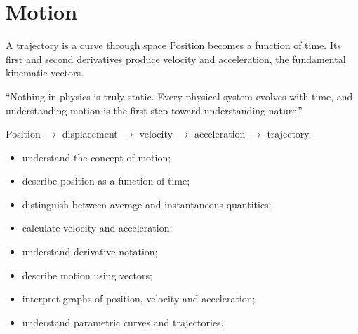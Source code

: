 \chapter{Motion}
\chapteropeningart
{A trajectory is a curve through space}
{Position becomes a function of time. Its first and second derivatives produce
velocity and acceleration, the fundamental kinematic vectors.}

\chapterquote
{``Nothing in physics is truly static. Every physical system evolves with time,
and understanding motion is the first step toward understanding nature.''}
{}

\begin{roadmapbox}
Position $\longrightarrow$ displacement $\longrightarrow$ velocity
$\longrightarrow$ acceleration $\longrightarrow$ trajectory.
\end{roadmapbox}


\learningobjectives


\begin{itemize}
	\item understand the concept of motion;
	\item describe position as a function of time;
	\item distinguish between average and instantaneous quantities;
	\item calculate velocity and acceleration;
	\item understand derivative notation;
	\item describe motion using vectors;
	\item interpret graphs of position, velocity and acceleration;
	\item understand parametric curves and trajectories.
\end{itemize}

\newpage


